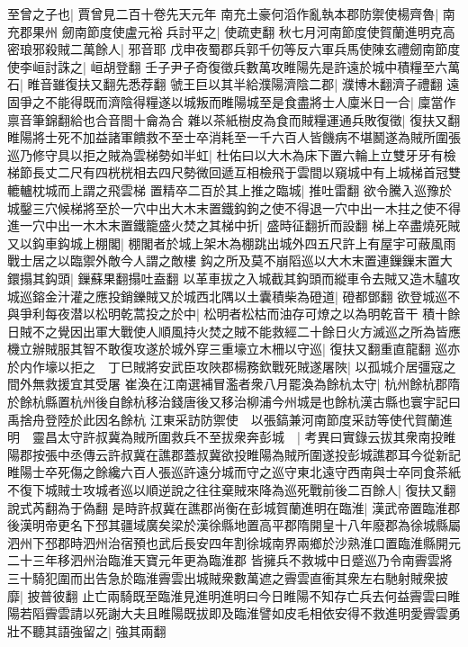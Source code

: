至曾之子也|{
	賈曾見二百十卷先天元年}
南充土豪何滔作亂執本郡防禦使楊齊魯|{
	南充郡果州}
劒南節度使盧元裕兵討平之|{
	使疏吏翻}
秋七月河南節度使賀蘭進明克高密琅邪殺賊二萬餘人|{
	邪音耶}
戊申夜蜀郡兵郭千仞等反六軍兵馬使陳玄禮劒南節度使李峘討誅之|{
	峘胡登翻}
壬子尹子奇復徵兵數萬攻睢陽先是許遠於城中積糧至六萬石|{
	睢音雖復扶又翻先悉荐翻}
虢王巨以其半給濮陽濟陰二郡|{
	濮博木翻濟子禮翻}
遠固爭之不能得既而濟陰得糧遂以城叛而睢陽城至是食盡將士人廩米日一合|{
	廩當作禀音筆錦翻給也合音閤十龠為合}
雜以茶紙樹皮為食而賊糧運通兵敗復徵|{
	復扶又翻}
睢陽將士死不加益諸軍饋救不至士卒消耗至一千六百人皆饑病不堪鬭遂為賊所圍張巡乃修守具以拒之賊為雲梯勢如半虹|{
	杜佑曰以大木為床下置六輪上立雙牙牙有檢梯節長丈二尺有四桄桄相去四尺勢微回遞互相檢飛于雲間以窺城中有上城梯首冠雙轆轤枕城而上謂之飛雲梯}
置精卒二百於其上推之臨城|{
	推吐雷翻}
欲令騰入巡豫於城鑿三穴候梯將至於一穴中出大木末置鐵鈎鉤之使不得退一穴中出一木拄之使不得進一穴中出一木木末置鐵籠盛火焚之其梯中折|{
	盛時征翻折而設翻}
梯上卒盡燒死賊又以鈎車鈎城上棚閣|{
	棚閣者於城上架木為棚跳出城外四五尺許上有屋宇可蔽風雨戰士居之以臨禦外敵今人謂之敵樓}
鈎之所及莫不崩䧟巡以大木末置連鏁鏁末置大鐶搨其鈎頭|{
	鏁蘇果翻搨吐盍翻}
以革車拔之入城截其鈎頭而縱車令去賊又造木驢攻城巡鎔金汁灌之應投銷鑠賊又於城西北隅以土囊積柴為磴道|{
	磴都鄧翻}
欲登城巡不與爭利每夜潜以松明乾蒿投之於中|{
	松明者松枯而油存可燎之以為明乾音干}
積十餘日賊不之覺因出軍大戰使人順風持火焚之賊不能救經二十餘日火方滅巡之所為皆應機立辦賊服其智不敢復攻遂於城外穿三重壕立木柵以守巡|{
	復扶又翻重直龍翻}
巡亦於内作壕以拒之　丁巳賊將安武臣攻陜郡楊務欽戰死賊遂屠陜|{
	以孤城介居彊寇之間外無救援宜其受屠}
崔渙在江南選補冒濫者衆八月罷渙為餘杭太守|{
	杭州餘杭郡隋於餘杭縣置杭州後自餘杭移治錢唐後又移治柳浦今州城是也餘杭漢古縣也寰宇記曰禹捨舟登陸於此因名餘杭}
江東采訪防禦使　以張鎬兼河南節度采訪等使代賀蘭進明　靈昌太守許叔冀為賊所圍救兵不至拔衆奔彭城　|{
	考異曰實錄云拔其衆南投睢陽郡按張中丞傳云許叔冀在譙郡蓋叔冀欲投睢陽為賊所圍遂投彭城譙郡耳今從新記}
睢陽士卒死傷之餘纔六百人張巡許遠分城而守之巡守東北遠守西南與士卒同食茶紙不復下城賊士攻城者巡以順逆說之往往棄賊來降為巡死戰前後二百餘人|{
	復扶又翻說式芮翻為于偽翻}
是時許叔冀在譙郡尚衡在彭城賀蘭進明在臨淮|{
	漢武帝置臨淮郡後漢明帝更名下邳其疆域廣矣梁於漢徐縣地置高平郡隋開皇十八年廢郡為徐城縣屬泗州下邳郡時泗州治宿預也武后長安四年割徐城南界兩鄉於沙熟淮口置臨淮縣開元二十三年移泗州治臨淮天寶元年更為臨淮郡}
皆擁兵不救城中日蹙巡乃令南霽雲將三十騎犯圍而出告急於臨淮霽雲出城賊衆數萬遮之霽雲直衝其衆左右馳射賊衆披靡|{
	披普彼翻}
止亡兩騎既至臨淮見進明進明曰今日睢陽不知存亡兵去何益霽雲曰睢陽若䧟霽雲請以死謝大夫且睢陽既拔即及臨淮譬如皮毛相依安得不救進明愛霽雲勇壯不聽其語強留之|{
	強其兩翻}

